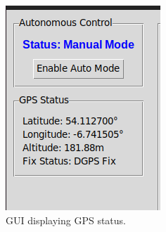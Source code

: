 \begin{figure}[h!]
    \centering
    \begin{subfigure}[b]{0.4\textwidth}
        \centering
        \includegraphics[width=\textwidth]{figures/gui_gps_status.png} %
        \caption{GUI displaying GPS status.}
        \label{fig:gui_gps_sub}
    \end{subfigure}
    \hfill %
    \begin{subfigure}[b]{0.58\textwidth}
        \centering

\end{subfigure}
\end{figure}
